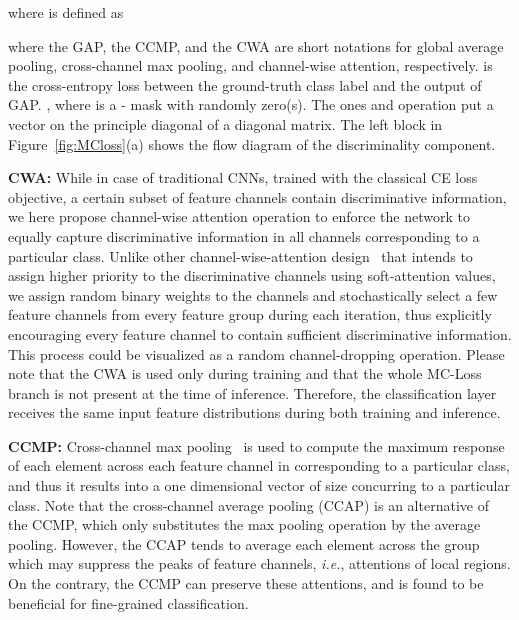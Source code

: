 \documentclass[journal]{IEEEtran}
\begin{document}
\begin{small}
  
\end{small}

\noindent where  is defined as

\begin{small}
  
\end{small}

\noindent where the GAP, the CCMP, and the CWA are short notations for global average pooling, cross-channel max pooling, and channel-wise attention,  respectively.  is the cross-entropy loss between the ground-truth class label  and the output of GAP. , where  is a - mask with randomly  zero(s). The   ones and operation  put a vector on the principle diagonal of a diagonal matrix. The left block in Figure~\ref{fig:MCloss}(a) shows the flow diagram of the discriminality component.

\noindent \textbf{CWA:} While in case of traditional CNNs, trained with the classical CE loss objective, a certain subset of feature channels contain discriminative information, we here propose channel-wise attention operation to enforce the network to equally capture discriminative information in all  channels corresponding to a particular class.  Unlike other channel-wise-attention design~\cite{chen2017sca} that intends to assign higher priority to the discriminative channels using soft-attention values, we assign random binary weights to the channels and stochastically select a few feature channels from every feature group  during each iteration, thus explicitly encouraging every feature channel to contain sufficient discriminative information. This process could be visualized as a random channel-dropping operation. Please note that the CWA is used only during training and that the whole MC-Loss branch is not present at the time of inference. Therefore, the classification layer receives the same input feature distributions during both training and inference.


\noindent \textbf{CCMP:} Cross-channel max pooling~\cite{goodfellow2013maxout} is used to compute the maximum response of each element across each feature channel in  corresponding to a particular class, and thus it results into a one dimensional vector of size  concurring to a particular class. Note that the cross-channel average pooling (CCAP) is an alternative of the CCMP, which only substitutes the max pooling operation by the average pooling. However, the CCAP tends to average each element across the group which may suppress the peaks of feature channels, \emph{i.e.}, attentions of local regions. On the contrary, the CCMP can preserve these attentions, and is found to be beneficial for fine-grained classification.
\end{document}
